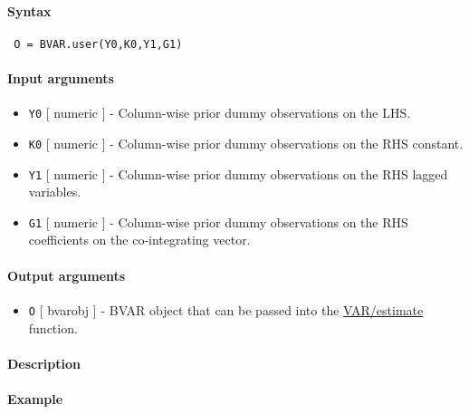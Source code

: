 


	\paragraph{Syntax}
 
 \begin{verbatim}
 O = BVAR.user(Y0,K0,Y1,G1)
 \end{verbatim}
 
 \paragraph{Input arguments}
 
 \begin{itemize}
 \item
   \texttt{Y0} {[} numeric {]} - Column-wise prior dummy observations on
   the LHS.
 \item
   \texttt{K0} {[} numeric {]} - Column-wise prior dummy observations on
   the RHS constant.
 \item
   \texttt{Y1} {[} numeric {]} - Column-wise prior dummy observations on
   the RHS lagged variables.
 \item
   \texttt{G1} {[} numeric {]} - Column-wise prior dummy observations on
   the RHS coefficients on the co-integrating vector.
 \end{itemize}
 
 \paragraph{Output arguments}
 
 \begin{itemize}
 \item
   \texttt{O} {[} bvarobj {]} - BVAR object that can be passed into the
   \url{VAR/estimate} function.
 \end{itemize}
 
 \paragraph{Description}
 
 \paragraph{Example}


